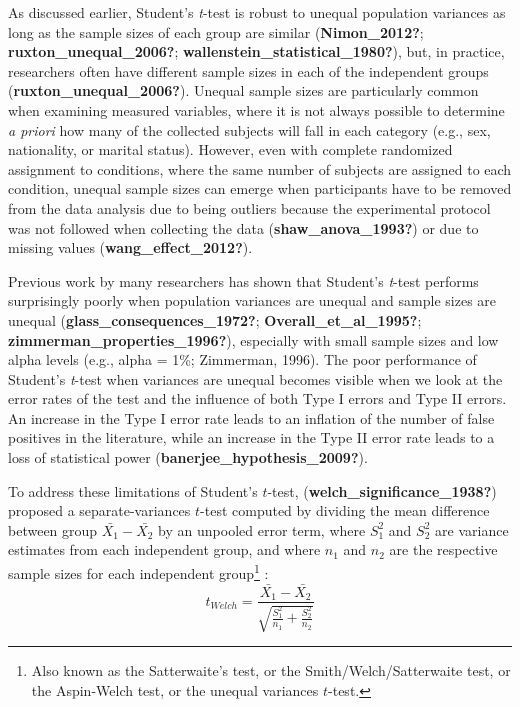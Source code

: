 \documentclass[
  english,
  man]{apa6}
\begin{document}
As discussed earlier, Student's \emph{t}-test is robust to unequal population variances as long as the sample sizes of each group are similar (\textbf{Nimon\_2012?}; \textbf{ruxton\_unequal\_2006?}; \textbf{wallenstein\_statistical\_1980?}), but, in practice, researchers often have different sample sizes in each of the independent groups (\textbf{ruxton\_unequal\_2006?}). Unequal sample sizes are particularly common when examining measured variables, where it is not always possible to determine \emph{a priori} how many of the collected subjects will fall in each category (e.g., sex, nationality, or marital status). However, even with complete randomized assignment to conditions, where the same number of subjects are assigned to each condition, unequal sample sizes can emerge when participants have to be removed from the data analysis due to being outliers because the experimental protocol was not followed when collecting the data (\textbf{shaw\_anova\_1993?}) or due to missing values (\textbf{wang\_effect\_2012?}).

Previous work by many researchers has shown that Student's \emph{t}-test performs surprisingly poorly when population variances are unequal and sample sizes are unequal (\textbf{glass\_consequences\_1972?}; \textbf{Overall\_et\_al\_1995?}; \textbf{zimmerman\_properties\_1996?}), especially with small sample sizes and low alpha levels (e.g., alpha = 1\%; Zimmerman, 1996). The poor performance of Student's \emph{t}-test when variances are unequal becomes visible when we look at the error rates of the test and the influence of both Type I errors and Type II errors. An increase in the Type I error rate leads to an inflation of the number of false positives in the literature, while an increase in the Type II error rate leads to a loss of statistical power (\textbf{banerjee\_hypothesis\_2009?}).

To address these limitations of Student's \(t\)-test, (\textbf{welch\_significance\_1938?}) proposed a separate-variances \(t\)-test computed by dividing the mean difference between group \(\bar{X_1}-\bar{X_2}\) by an unpooled error term, where \(S^2_1\) and \(S^2_2\) are variance estimates from each independent group, and where \(n_1\) and \(n_2\) are the respective sample sizes for each independent group\footnote{Also known as the Satterwaite’s test, or the Smith/Welch/Satterwaite test, or the Aspin-Welch test, or the unequal variances $t$-test.} :
\begin{equation*} 
t_{Welch}=\frac{\bar{X_1}-\bar{X_2}}{\sqrt{\frac{S^2_1}{n_1}+\frac{S^2_2}{n_2}}}
\label{eqn:Welch}
\end{equation*}
\end{document}
